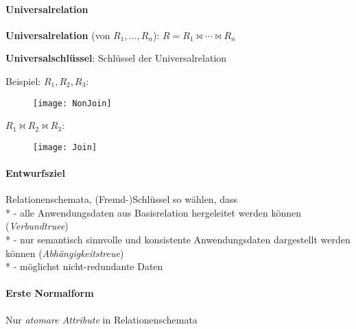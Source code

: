 \paragraph{Universalrelation}
\begin{items}
	\item \textbf{Universalrelation} (von \( R_1, \dots, R_n \)): \( R = R_1 \bowtie \cdots \bowtie R_n \)
	\item \textbf{Universalschlüssel}: Schlüssel der Universalrelation
	\item Beispiel: \( R_1, R_2, R_3 \):
	\begin{figure}[H]\centering\label{NonJoin}\texttt{[image: NonJoin]}\end{figure}
	\item \quad \( R_1 \bowtie R_2 \bowtie R_3 \):
	\begin{figure}[H]\centering\label{Join}\texttt{[image: Join]}\end{figure}
\end{items}



\paragraph{Entwurfsziel}
\begin{items}
	\item Relationenschemata, (Fremd-)Schlüssel so wählen, dass \\*
		- alle Anwendungsdaten aus Basisrelation hergeleitet werden können (\emph{Verbundtruee}) \\*
		- nur semantisch sinnvolle und konsistente Anwendungsdaten dargestellt werden können (\emph{Abhängigkeitstreue}) \\*
		- möglichst nicht-redundante Daten
\end{items}

\paragraph{Erste Normalform}
\begin{items}
	\item Nur \emph{atomare Attribute} in Relationenschemata
\end{items}

